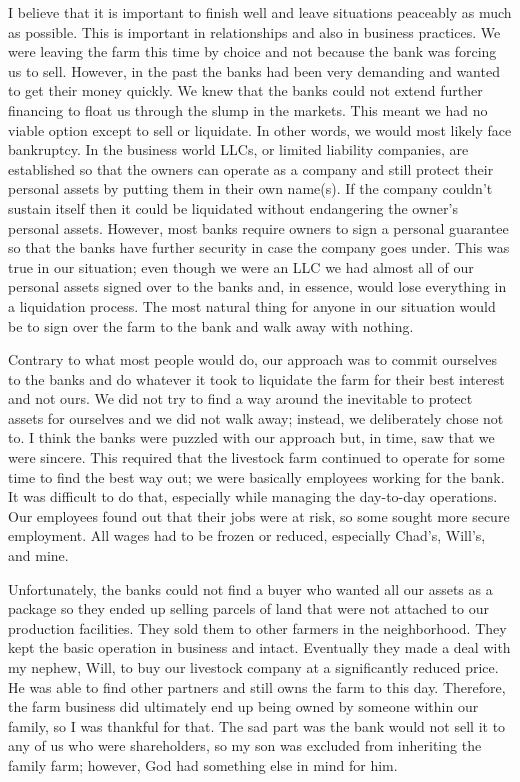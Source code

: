 \documentclass[twoside, 12pt]{book}
\begin{document}
I believe that it is important to finish well and leave situations peaceably as much as possible. This is important in relationships and also in business practices. We were leaving the farm this time by choice and not because the bank was forcing us to sell. However, in the past the banks had been very demanding and wanted to get their money quickly. We knew that the banks could not extend further financing to float us through the slump in the markets. This meant we had no viable option except to sell or liquidate. In other words, we would most likely face bankruptcy. In the business world LLCs, or limited liability companies, are established so that the owners can operate as a company and still protect their personal assets by putting them in their own name(s). If the company couldn’t sustain itself then it could be liquidated without endangering the owner’s personal assets. However, most banks require owners to sign a personal guarantee so that the banks have further security in case the company goes under. This was true in our situation; even though we were an LLC we had almost all of our personal assets signed over to the banks and, in essence, would lose everything in a liquidation process. The most natural thing for anyone in our situation would be to sign over the farm to the bank and walk away with nothing. 

Contrary to what most people would do, our approach was to commit ourselves to the banks and do whatever it took to liquidate the farm for their best interest and not ours. We did not try to find a way around the inevitable to protect assets for ourselves and we did not walk away; instead, we deliberately chose not to. I think the banks were puzzled with our approach but, in time, saw that we were sincere. This required that the livestock farm continued to operate for some time to find the best way out; we were basically employees working for the bank. It was difficult to do that, especially while managing the day-to-day operations. Our employees found out that their jobs were at risk, so some sought more secure employment. All wages had to be frozen or reduced, especially Chad’s, Will’s, and mine. 

Unfortunately, the banks could not find a buyer who wanted all our assets as a package so they ended up selling parcels of land that were not attached to our production facilities. They sold them to other farmers in the neighborhood. They kept the basic operation in business and intact. Eventually they made a deal with my nephew, Will, to buy our livestock company at a significantly reduced price. He was able to find other partners and still owns the farm to this day. Therefore, the farm business did ultimately end up being owned by someone within our family, so I was thankful for that. The sad part was the bank would not sell it to any of us who were shareholders, so my son was excluded from inheriting the family farm; however, God had something else in mind for him.
\end{document}
